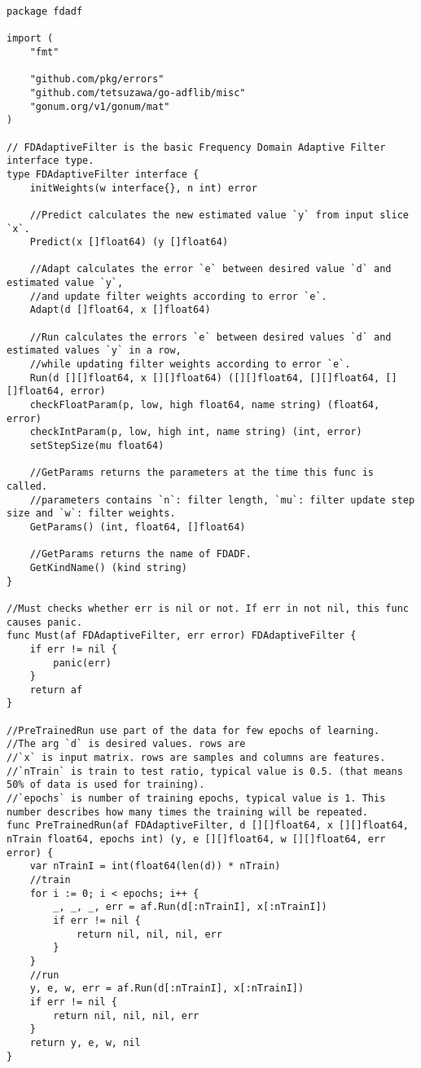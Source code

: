 \begin{lstlisting}[caption=fdadf/base.go,label=fdadf/base.go]
package fdadf

import (
    "fmt"

    "github.com/pkg/errors"
    "github.com/tetsuzawa/go-adflib/misc"
    "gonum.org/v1/gonum/mat"
)

// FDAdaptiveFilter is the basic Frequency Domain Adaptive Filter interface type.
type FDAdaptiveFilter interface {
    initWeights(w interface{}, n int) error

    //Predict calculates the new estimated value `y` from input slice `x`.
    Predict(x []float64) (y []float64)

    //Adapt calculates the error `e` between desired value `d` and estimated value `y`,
    //and update filter weights according to error `e`.
    Adapt(d []float64, x []float64)

    //Run calculates the errors `e` between desired values `d` and estimated values `y` in a row,
    //while updating filter weights according to error `e`.
    Run(d [][]float64, x [][]float64) ([][]float64, [][]float64, [][]float64, error)
    checkFloatParam(p, low, high float64, name string) (float64, error)
    checkIntParam(p, low, high int, name string) (int, error)
    setStepSize(mu float64)

    //GetParams returns the parameters at the time this func is called.
    //parameters contains `n`: filter length, `mu`: filter update step size and `w`: filter weights.
    GetParams() (int, float64, []float64)

    //GetParams returns the name of FDADF.
    GetKindName() (kind string)
}

//Must checks whether err is nil or not. If err in not nil, this func causes panic.
func Must(af FDAdaptiveFilter, err error) FDAdaptiveFilter {
    if err != nil {
        panic(err)
    }
    return af
}

//PreTrainedRun use part of the data for few epochs of learning.
//The arg `d` is desired values. rows are
//`x` is input matrix. rows are samples and columns are features.
//`nTrain` is train to test ratio, typical value is 0.5. (that means 50% of data is used for training).
//`epochs` is number of training epochs, typical value is 1. This number describes how many times the training will be repeated.
func PreTrainedRun(af FDAdaptiveFilter, d [][]float64, x [][]float64, nTrain float64, epochs int) (y, e [][]float64, w [][]float64, err error) {
    var nTrainI = int(float64(len(d)) * nTrain)
    //train
    for i := 0; i < epochs; i++ {
        _, _, _, err = af.Run(d[:nTrainI], x[:nTrainI])
        if err != nil {
            return nil, nil, nil, err
        }
    }
    //run
    y, e, w, err = af.Run(d[:nTrainI], x[:nTrainI])
    if err != nil {
        return nil, nil, nil, err
    }
    return y, e, w, nil
}


\end{lstlisting}
